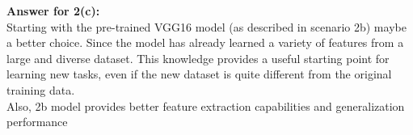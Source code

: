 \documentclass[a4paper]{article}
\begin{document}
\begin{enumerate}
\begin{enumerate}
			\noindent \textbf{Answer for 2(c):} \\

			Starting with the pre-trained VGG16 model (as described in scenario 2b) maybe a better choice. Since the model has already learned a variety of features from a large and diverse dataset. This knowledge provides a useful starting point for learning new tasks, even if the new dataset is quite different from the original training data. \\
			Also, 2b model provides better feature extraction capabilities and generalization performance
		\end{enumerate} 
	\end{enumerate}
\end{document}
